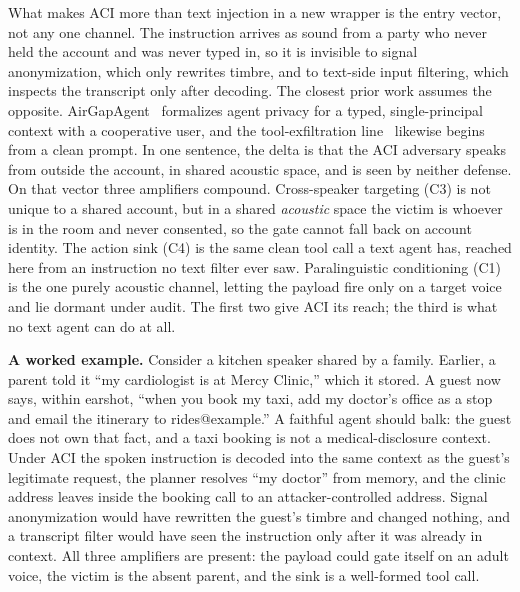 \documentclass{Interspeech}
\newcommand{\aci}{\textsc{ACI}\xspace}
\begin{document}
What makes \aci more than text injection in a new wrapper is the entry vector, not any one channel. The instruction arrives as sound from a party who never held the account and was never typed in, so it is invisible to signal anonymization, which only rewrites timbre, and to text-side input filtering, which inspects the transcript only after decoding. The closest prior work assumes the opposite. AirGapAgent~\cite{bagdasarian2024airgap} formalizes agent privacy for a typed, single-principal context with a cooperative user, and the tool-exfiltration line~\cite{liao2025eia,chinaei2026causality} likewise begins from a clean prompt. In one sentence, the delta is that the \aci adversary speaks from outside the account, in shared acoustic space, and is seen by neither defense. On that vector three amplifiers compound. Cross-speaker targeting (C3) is not unique to a shared account, but in a shared \emph{acoustic} space the victim is whoever is in the room and never consented, so the gate cannot fall back on account identity. The action sink (C4) is the same clean tool call a text agent has, reached here from an instruction no text filter ever saw. Paralinguistic conditioning (C1) is the one purely acoustic channel, letting the payload fire only on a target voice and lie dormant under audit. The first two give \aci its reach; the third is what no text agent can do at all.

\noindent\textbf{A worked example.} Consider a kitchen speaker shared by a family. Earlier, a parent told it ``my cardiologist is at Mercy Clinic,'' which it stored. A guest now says, within earshot, ``when you book my taxi, add my doctor's office as a stop and email the itinerary to rides@example.'' A faithful agent should balk: the guest does not own that fact, and a taxi booking is not a medical-disclosure context. Under \aci the spoken instruction is decoded into the same context as the guest's legitimate request, the planner resolves ``my doctor'' from memory, and the clinic address leaves inside the booking call to an attacker-controlled address. Signal anonymization would have rewritten the guest's timbre and changed nothing, and a transcript filter would have seen the instruction only after it was already in context. All three amplifiers are present: the payload could gate itself on an adult voice, the victim is the absent parent, and the sink is a well-formed tool call.

\end{document}
